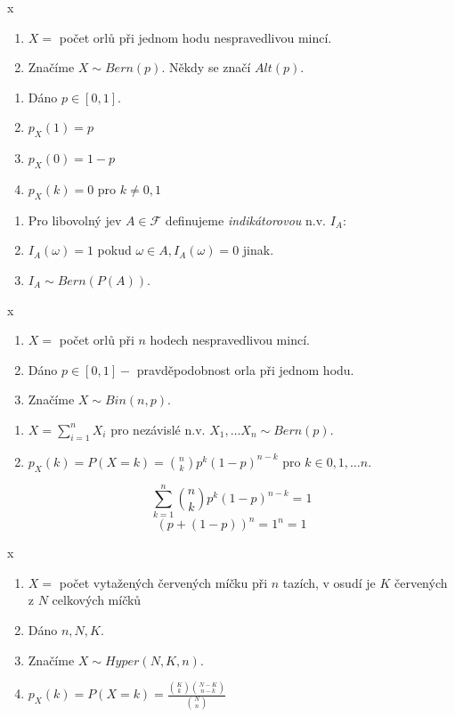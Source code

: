 \documentclass[../main.tex]{subfiles}
\begin{document}
\begin{definition} {\color{white} x}
    \begin{enumerate}
        \item $X = $ počet orlů při jednom hodu nespravedlivou mincí.
        \item Značíme $X \sim Bern(p)$. Někdy se značí $Alt(p)$.
    \end{enumerate}

    \begin{enumerate}
        \item Dáno $p \in [0,1]$.
        \item $p_X(1)=p$
        \item $p_X(0) = 1 - p$
        \item $p_X(k) = 0$ pro $k \neq 0,1$
    \end{enumerate}

    \begin{enumerate}
        \item Pro libovolný jev $A \in \mathcal{F}$ definujeme \textit{indikátorovou} n.v. $I_A$:
        \item $I_A(\omega) = 1$ pokud $\omega \in A, I_A(\omega) = 0$ jinak.
        \item $I_A \sim  Bern(P(A))$.
    \end{enumerate}
\end{definition}

\begin{definition} {\color{white} x}
    \begin{enumerate}
        \item $X = $ počet orlů při $n$ hodech nespravedlivou mincí.
        \item Dáno $p \in [0,1] - $ pravděpodobnost orla při jednom hodu.
        \item Značíme $X \sim Bin(n,p)$. 
    \end{enumerate}
    \begin{enumerate}
        \item $X = \sum^n_{i=1}X_i$ pro nezávislé n.v. $X_1,\dots X_n \sim Bern(p)$.
        \item $p_X(k) = P(X = k) = \binom{n}{k}p^k(1-p)^{n-k}$ pro $k\in {0,1,\dots n}$.
    \end{enumerate}
    \[\sum^n_{k=1}\binom{n}{k}p^k(1-p)^{n-k} = 1\]
    \[(p + (1-p))^n = 1^n = 1\]
\end{definition}

\begin{definition} {\color{white} x}
    \begin{enumerate}
        \item $X = $ počet vytažených červených míčku při $n$ tazích, v osudí je 
        $K$ červených z $N$ celkových míčků
        \item Dáno $n,N,K$.
        \item Značíme $X \sim Hyper(N,K,n)$.
        \item $p_X(k) = P(X = k) = \frac{\binom{K}{k}\binom{N-K}{n-k}}{\binom{N}{n}}$
    \end{enumerate}
\end{definition}
\end{document}
